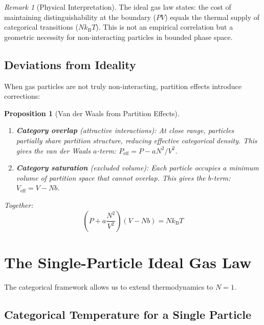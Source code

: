 \documentclass[twocolumn,10pt,a4paper]{article}
\theoremstyle{plain}
\newtheorem{proposition}[theorem]{Proposition}
\theoremstyle{definition}
\theoremstyle{remark}
\newtheorem{remark}[theorem]{Remark}
\newcommand{\kB}{k_{\mathrm{B}}}
\begin{document}
\begin{remark}[Physical Interpretation]
The ideal gas law states: the cost of maintaining distinguishability at the boundary ($PV$) equals the thermal supply of categorical transitions ($N\kB T$). This is not an empirical correlation but a geometric necessity for non-interacting particles in bounded phase space.
\end{remark}

\subsection{Deviations from Ideality}

When gas particles are not truly non-interacting, partition effects introduce corrections:

\begin{proposition}[Van der Waals from Partition Effects]
\label{prop:vdw}
\begin{enumerate}
    \item \textbf{Category overlap} (attractive interactions): At close range, particles partially share partition structure, reducing effective categorical density. This gives the van der Waals $a$-term: $P_{\mathrm{eff}} = P - a N^2/V^2$.
    \item \textbf{Category saturation} (excluded volume): Each particle occupies a minimum volume of partition space that cannot overlap. This gives the $b$-term: $V_{\mathrm{eff}} = V - Nb$.
\end{enumerate}
Together:
\begin{equation}
    \left(P + a\frac{N^2}{V^2}\right)(V - Nb) = N\kB T
\end{equation}
\end{proposition}

\section{The Single-Particle Ideal Gas Law}
\label{sec:single_particle}

The categorical framework allows us to extend thermodynamics to $N = 1$.

\subsection{Categorical Temperature for a Single Particle}
\end{document}
